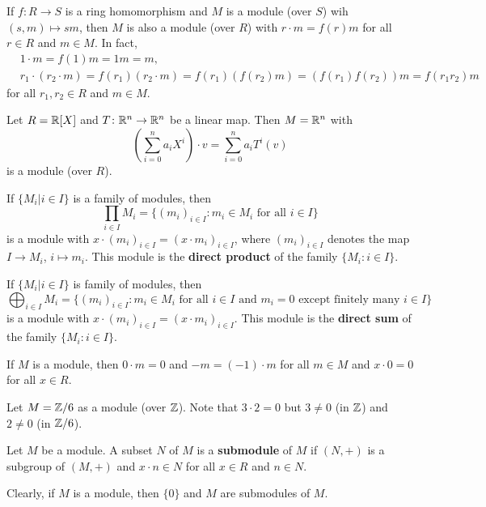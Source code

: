 \begin{example}
If $f\colon R\to S$ is a ring homomorphism and $M$ is a module (over $S$) wih 
$(s,m)\mapsto sm$, then 
$M$ is also a module (over $R$) with $r\cdot m=f(r)m$ for all $r\in R$ and $m\in M$. In fact, 
\begin{align*}
&1\cdot m=f(1)m=1m=m,\\
&r_1\cdot (r_2\cdot m)=f(r_1)(r_2\cdot m)=f(r_1)(f(r_2)m)=(f(r_1)f(r_2))m=f(r_1r_2)m
\end{align*}
for all $r_1,r_2\in R$ and $m\in M$.	  	
\end{example}
%
\begin{example}
Let $R=\mathbb{R}[X]$ and $T\colon\mathbb{R}^n\to\mathbb{R}^n$ be a linear map. Then $M=\mathbb{R}^n$ with 
\[
\left(\sum_{i=0}^na_iX^i\right)\cdot v=\sum_{i=0}^na_iT^i(v)
\]	
is a module (over $R$).   
\end{example}

\begin{example}
If $\{M_i|i\in I\}$ is a family of modules, then  	
\[
\prod_{i\in I}M_i=\{(m_i)_{i\in I}:m_i\in M_i\text{ for all $i\in I$}\}
\]
is a module with 
$x\cdot (m_i)_{i\in I}=(x\cdot m_i)_{i\in I}$, 
where $(m_i)_{i\in I}$ denotes the map $I\to M_i$, $i\mapsto m_i$.
This module is the \textbf{direct product} of the family $\{M_i:i\in I\}$.
\end{example}
%
\begin{example}
If $\{M_i|i\in I\}$ is family of modules, then   	
\[
\bigoplus_{i\in I}M_i=\{(m_i)_{i\in I}:m_i\in M_i\text{ for all $i\in I$ and $m_i=0$ except finitely many $i\in I$}\}
\]
is a module with 
$x\cdot (m_i)_{i\in I}=(x\cdot m_i)_{i\in I}$. 
This module is the \textbf{direct sum} of the family $\{M_i:i\in I\}$. 
\end{example}
%
If $M$ is a module, then $0\cdot m=0$ and $-m=(-1)\cdot m$ for all $m\in M$ and 
$x\cdot 0=0$ for all $x\in R$. 
%
\begin{example}
Let $M=\mathbb{Z}/6$ as a module (over $\mathbb{Z}$). Note that 
$3\cdot 2=0$ but $3\ne 0$ (in $\mathbb{Z}$) and $2\ne 0$ (in $\mathbb{Z}/6$).  
\end{example}
%
\begin{definition}
	Let $M$ be a module. A subset $N$ of $M$ is a \textbf{submodule} of $M$ if 
	$(N,+)$ is a subgroup of $(M,+)$ and 
	$x\cdot n\in N$ for all $x\in R$ and $n\in N$. 
\end{definition}

Clearly, if $M$ is a module, then $\{0\}$ and $M$ are submodules of $M$. 

